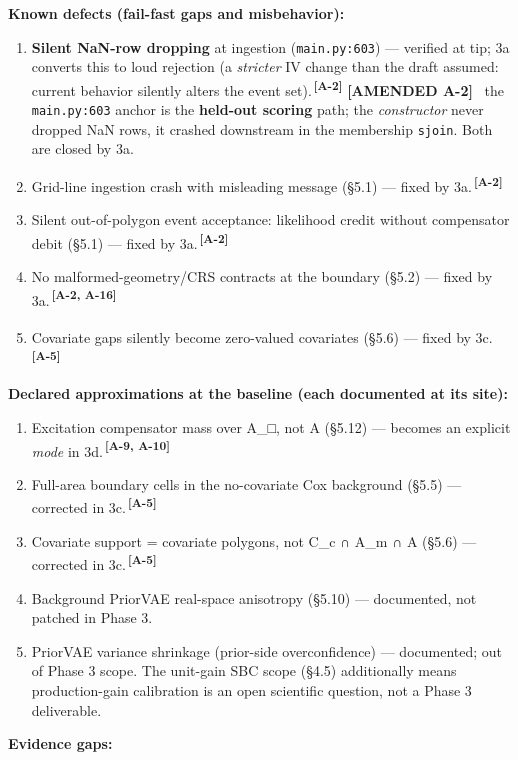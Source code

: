 \documentclass[
  10pt,
]{article}
\providecommand{\tightlist}{%
  \setlength{\itemsep}{0pt}\setlength{\parskip}{0pt}}
\newcommand{\amdref}[1]{{\color{amdcolor}\textsuperscript{\,\textbf{[#1]}}}}
\newcommand{\amd}[1]{{\color{amdcolor}\footnotesize\textbf{[AMENDED #1]}}\ }
\begin{document}
\textbf{Known defects (fail-fast gaps and misbehavior):}

\begin{enumerate}
\def\labelenumi{\arabic{enumi}.}
\tightlist
\item
  \textbf{Silent NaN-row dropping} at ingestion (\texttt{main.py:603}) --- verified at tip; 3a converts this to loud rejection (a \emph{stricter} IV change than the draft assumed: current behavior silently alters the event set).\amdref{A-2} \amd{A-2} the \texttt{main.py:603} anchor is the \textbf{held-out scoring} path; the \emph{constructor} never dropped NaN rows, it crashed downstream in the membership \texttt{sjoin}. Both are closed by 3a.
\item
  Grid-line ingestion crash with misleading message (§5.1) --- fixed by 3a.\amdref{A-2}
\item
  Silent out-of-polygon event acceptance: likelihood credit without compensator debit (§5.1) --- fixed by 3a.\amdref{A-2}
\item
  No malformed-geometry/CRS contracts at the boundary (§5.2) --- fixed by 3a.\amdref{A-2, A-16}
\item
  Covariate gaps silently become zero-valued covariates (§5.6) --- fixed by 3c.\amdref{A-5}
\end{enumerate}

\textbf{Declared approximations at the baseline (each documented at its site):}

\begin{enumerate}
\def\labelenumi{\arabic{enumi}.}
\setcounter{enumi}{5}
\tightlist
\item
  Excitation compensator mass over A\_□, not A (§5.12) --- becomes an explicit \emph{mode} in 3d.\amdref{A-9, A-10}
\item
  Full-area boundary cells in the no-covariate Cox background (§5.5) --- corrected in 3c.\amdref{A-5}
\item
  Covariate support = covariate polygons, not C\_c ∩ A\_m ∩ A (§5.6) --- corrected in 3c.\amdref{A-5}
\item
  Background PriorVAE real-space anisotropy (§5.10) --- documented, not patched in Phase 3.
\item
  PriorVAE variance shrinkage (prior-side overconfidence) --- documented; out of Phase 3 scope. The unit-gain SBC scope (§4.5) additionally means production-gain calibration is an open scientific question, not a Phase 3 deliverable.
\end{enumerate}

\textbf{Evidence gaps:}
\end{document}
